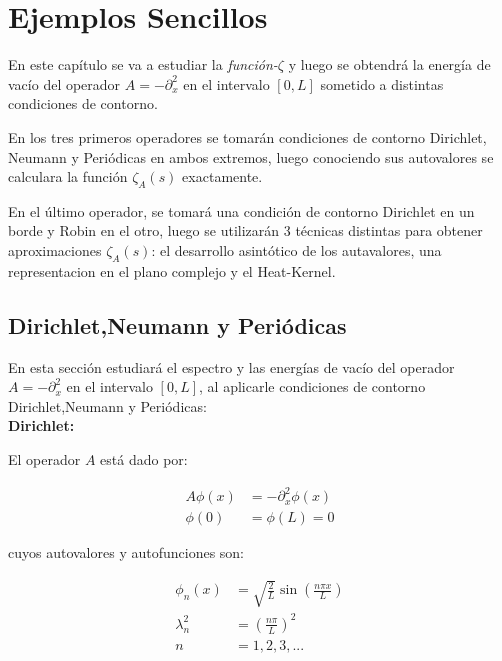\chapter{Ejemplos Sencillos}

En este capítulo se va a estudiar la {\it función-$\zeta$} y luego se obtendrá la energía de vacío del operador $A = - \partial ^2 _x$ en el intervalo $[0,L]$ sometido a distintas condiciones de contorno. 

En los tres primeros operadores se tomarán condiciones de contorno Dirichlet, Neumann y Periódicas en ambos extremos, luego conociendo sus autovalores  se calculara la función $ \zeta _A (s) $ exactamente. 

En el último operador, se tomará una condición de contorno Dirichlet en un borde y Robin en el otro, luego se utilizarán 3 técnicas distintas para obtener aproximaciones $\zeta _A (s)$: el desarrollo asintótico de los autavalores, una representacion en el plano complejo  y el Heat-Kernel.

\section{Dirichlet,Neumann y Periódicas}

En esta sección estudiará el espectro y las energías de vacío del operador $A = - \partial ^2 _x$ en el intervalo $[0,L]$, al aplicarle condiciones de contorno Dirichlet,Neumann y Periódicas:\\

\textbf{Dirichlet:}


El operador $A$ está dado por:

\begin{equation}
\begin{aligned}
	A \phi (x) &= - \partial _x ^2 \phi (x) \\[10pt]
    \phi (0) &= \phi(L) = 0 
\end{aligned}
\end{equation}



cuyos autovalores y autofunciones son: 

\begin{equation}
\begin{aligned}
	\phi _n (x) &= \sqrt{\frac{2}{L}} \sin( \frac{n \pi x}{L} ) \\[10pt]
	\lambda _n ^2 &= \left( \frac{n \pi }{L} \right) ^2 \\[10pt]
	n &= 1,2,3, ...
\end{aligned}
\end{equation}


